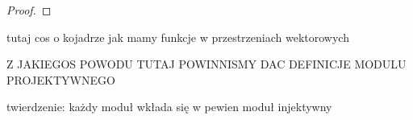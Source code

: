 \begin{proof}
\end{proof}

tutaj cos o kojadrze jak mamy funkcje w przestrzeniach wektorowych

Z JAKIEGOS POWODU TUTAJ POWINNISMY  DAC DEFINICJE MODULU PROJEKTYWNEGO

twierdzenie: każdy moduł wkłada się w pewien moduł injektywny
